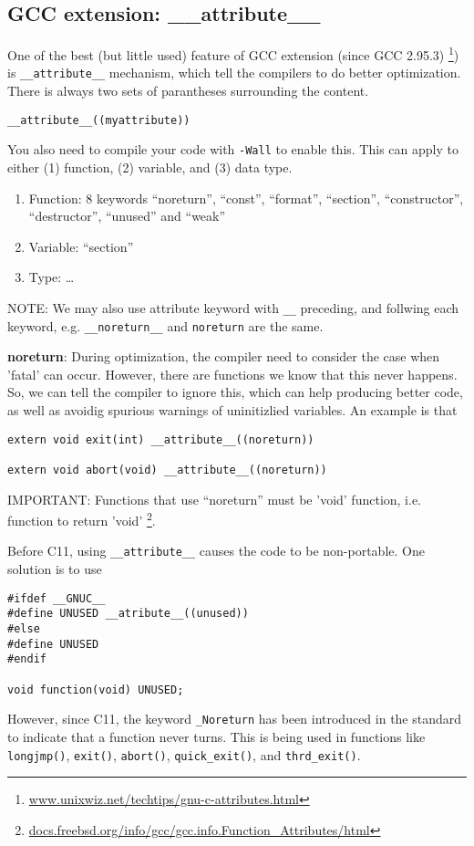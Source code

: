 \subsection{GCC extension: \_\_attribute\_\_}
\label{sec:__attribute__}

One of the best (but little used) feature of GCC extension (since GCC 2.95.3)
\footnote{\url{www.unixwiz.net/techtips/gnu-c-attributes.html}}) is
\verb!__attribute__! mechanism, which tell the compilers to do better
optimization. There is always two sets of parantheses surrounding the content.
\begin{verbatim}
__attribute__((myattribute))
\end{verbatim}

You also need to compile your code with \verb!-Wall! to enable this. This can
apply to either (1) function, (2) variable, and (3) data type.
\begin{enumerate}
  \item Function: 8 keywords ``noreturn'', ``const'', ``format'', ``section'',
  ``constructor'', ``destructor'', ``unused'' and ``weak''
  \item Variable: ``section''
  \item Type: \ldots
\end{enumerate}
NOTE: We may also use attribute keyword with \verb!__! preceding, and follwing
each keyword, e.g. \verb!__noreturn__! and \verb!noreturn! are the same.

{\bf noreturn}: During optimization, the compiler need to consider the case when
'fatal' can occur. However, there are functions we know that this never happens.
So, we can tell the compiler to ignore this, which can help producing better
code, as well as avoidig spurious warnings of uninitizlied variables. An example
is that 
\begin{verbatim}
extern void exit(int) __attribute__((noreturn))

extern void abort(void) __attribute__((noreturn))
\end{verbatim}
IMPORTANT: Functions that use ``noreturn'' must be 'void' function, i.e.
function to return 'void'
\footnote{\url{docs.freebsd.org/info/gcc/gcc.info.Function_Attributes/html}}.



Before C11, using \verb!__attribute__! causes the code to be non-portable. One
solution is to use
\begin{verbatim}
#ifdef __GNUC__
#define UNUSED __atribute__((unused))
#else
#define UNUSED
#endif

void function(void) UNUSED;
\end{verbatim}
However, since C11, the keyword \verb!_Noreturn! has been introduced in the
standard to indicate that a function never turns. This is being used in
functions like \verb!longjmp()!, \verb!exit()!, \verb!abort()!,
\verb!quick_exit()!, and \verb!thrd_exit()!.

